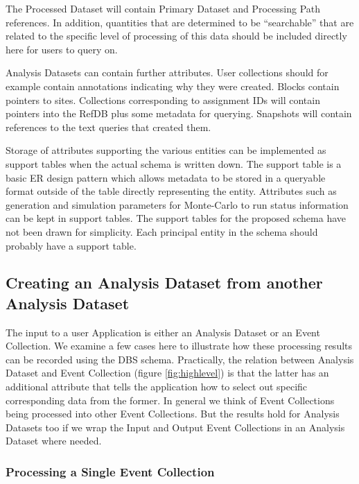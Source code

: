 \documentclass{cmspaper}
\begin{document}
The Processed Dataset will contain Primary Dataset and Processing Path 
references.
In addition, quantities that are determined to be ``searchable'' that are related to the 
specific level of processing of this data should be included directly here for 
users to query on.  

Analysis Datasets can contain further attributes.  User collections should for 
example contain annotations indicating why they were created.  Blocks contain 
pointers to sites.  Collections corresponding to assignment IDs will contain pointers 
into the RefDB plus some metadata for querying. Snapshots will contain references to the
text queries that created them.

Storage of attributes supporting the various 
entities  can be implemented as support tables when the actual schema is written down.  
The support table 
is a basic ER design pattern which allows metadata to be stored in a queryable format 
outside of the table directly representing the entity.  Attributes such as generation and 
simulation parameters for Monte-Carlo to run status information can be kept in support 
tables.   The support tables for the proposed schema have not been drawn for simplicity.  
Each principal entity in the schema should probably have a support table.

\subsection{Creating an Analysis Dataset from another Analysis Dataset}
\label{sec:createEvColl}

The input to a user Application is either an Analysis Dataset or an Event Collection.
We examine a few cases here to illustrate how these processing results can be 
recorded using the DBS schema.  Practically, the 
relation between Analysis Dataset and Event Collection 
(figure \ref{fig:highlevel}) is that the latter has an additional attribute that tells 
the application how to select out specific corresponding data from the former.  
In general we think of Event Collections being processed into other Event Collections. 
But the results hold for Analysis Datasets too if we wrap the Input and Output Event Collections
in an Analysis Dataset where needed.

\subsubsection{Processing a Single Event Collection}
\end{document}
